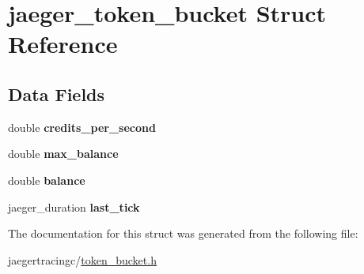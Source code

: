 \hypertarget{structjaeger__token__bucket}{}\section{jaeger\+\_\+token\+\_\+bucket Struct Reference}
\label{structjaeger__token__bucket}
\subsection*{Data Fields}
\begin{DoxyCompactItemize}
\item 
\mbox{\label{structjaeger__token__bucket_a6c34455efc70e94d5723c4883700234b}} 
double {\bfseries credits\+\_\+per\+\_\+second}
\item 
\mbox{\label{structjaeger__token__bucket_a9d19702f34ee0d6f287e6bc16278f181}} 
double {\bfseries max\+\_\+balance}
\item 
\mbox{\label{structjaeger__token__bucket_a903d00af2a3538eebb35470b8cc85f74}} 
double {\bfseries balance}
\item 
\mbox{\label{structjaeger__token__bucket_a1e740e19399b191389a7bc17ab9143d5}} 
jaeger\+\_\+duration {\bfseries last\+\_\+tick}
\end{DoxyCompactItemize}


The documentation for this struct was generated from the following file\+:\begin{DoxyCompactItemize}
\item 
jaegertracingc/\mbox{\hyperlink{token__bucket_8h}{token\+\_\+bucket.\+h}}\end{DoxyCompactItemize}
